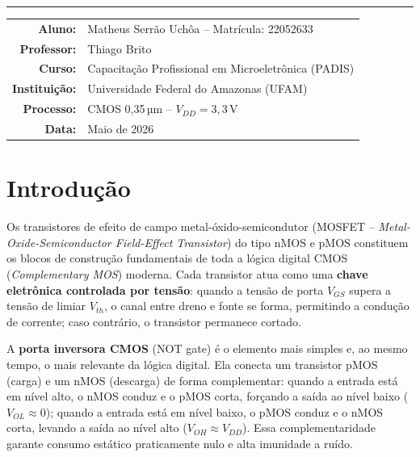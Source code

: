 \documentclass[12pt,a4paper]{article}
\begin{document}
\begin{titlepage}
  \vspace{0.7cm}
  \textcolor{cinzaborda}{\rule{\linewidth}{0.6pt}}
  \vspace{0.7cm}

  \begin{tabular}{rl}
    \textbf{Aluno:}       & Matheus Serrão Uchôa -- Matrícula: 22052633 \\[4pt]
    \textbf{Professor:}   & Thiago Brito \\[4pt]
    \textbf{Curso:}       & Capacitação Profissional em Microeletrônica (PADIS) \\[4pt]
    \textbf{Instituição:} & Universidade Federal do Amazonas (UFAM) \\[4pt]
    \textbf{Processo:}    & CMOS 0,35\,µm -- $V_{DD} = 3{,}3$\,V \\[4pt]
    \textbf{Data:}        & Maio de 2026
  \end{tabular}
\end{titlepage}

\tableofcontents
\newpage

\section{Introdução}

Os transistores de efeito de campo metal-óxido-semicondutor (MOSFET --
\textit{Metal-Oxide-Semiconductor Field-Effect Transistor}) do tipo nMOS e pMOS
constituem os blocos de construção fundamentais de toda a lógica digital CMOS
(\textit{Complementary MOS}) moderna. Cada transistor atua como uma \textbf{chave
eletrônica controlada por tensão}: quando a tensão de porta $V_{GS}$ supera a
tensão de limiar $V_{th}$, o canal entre dreno e fonte se forma, permitindo a
condução de corrente; caso contrário, o transistor permanece cortado.

A \textbf{porta inversora CMOS} (NOT gate) é o elemento mais simples e, ao mesmo
tempo, o mais relevante da lógica digital. Ela conecta um transistor pMOS (carga)
e um nMOS (descarga) de forma complementar: quando a entrada está em nível alto,
o nMOS conduz e o pMOS corta, forçando a saída ao nível baixo ($V_{OL} \approx 0$);
quando a entrada está em nível baixo, o pMOS conduz e o nMOS corta, levando a
saída ao nível alto ($V_{OH} \approx V_{DD}$). Essa complementaridade garante
consumo estático praticamente nulo e alta imunidade a ruído.
\end{document}
